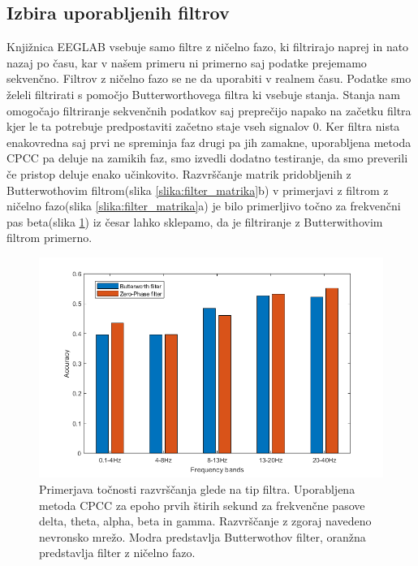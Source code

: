 \newpage
\subsection{Izbira uporabljenih filtrov}
Knjižnica EEGLAB vsebuje samo filtre z ničelno fazo, ki filtrirajo naprej in nato nazaj po času, kar v našem primeru ni primerno saj podatke prejemamo sekvenčno. Filtrov z ničelno fazo se ne da uporabiti v realnem času. Podatke smo želeli filtrirati s pomočjo Butterworthovega filtra ki vsebuje stanja. Stanja nam omogočajo filtriranje sekvenčnih podatkov saj preprečijo napako na začetku filtra kjer le ta potrebuje predpostaviti začetno staje vseh signalov 0. Ker filtra nista enakovredna saj prvi ne spreminja faz drugi pa jih zamakne, uporabljena metoda CPCC pa deluje na zamikih faz, smo izvedli dodatno testiranje, da smo preverili če pristop deluje enako učinkovito. Razvrščanje matrik pridobljenih z Butterwothovim filtrom(slika \ref{slika:filter_matrika}b) v primerjavi z filtrom z ničelno fazo(slika \ref{slika:filter_matrika}a) je bilo primerljivo točno za frekvenčni pas beta(slika \ref{slika:primerjava_filtrov}) iz česar lahko sklepamo, da je filtriranje z Butterwithovim filtrom primerno.
\begin{figure}
    \begin{center}
    \includegraphics[width=1 \linewidth]{slike/ComparisonFilters.png}
    \end{center}
    \caption[Točnost razvrščanja glede na tip filtra in frekvenčno območje.]{Primerjava točnosti razvrščanja glede na tip filtra. Uporabljena metoda CPCC za epoho prvih štirih sekund za frekvenčne pasove delta, theta, alpha, beta in gamma. Razvrščanje z zgoraj navedeno nevronsko mrežo. Modra predstavlja Butterwothov filter, oranžna predstavlja filter z ničelno fazo.}
    \label{slika:primerjava_filtrov}
\end{figure}

